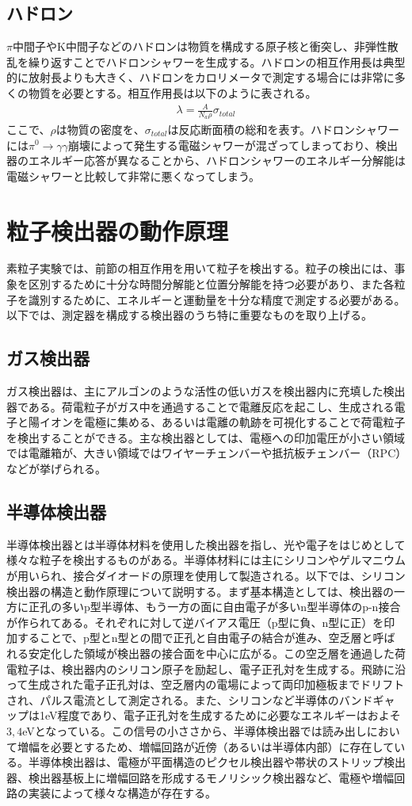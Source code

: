 \subsection{ハドロン}
$\pi$中間子やK中間子などのハドロンは物質を構成する原子核と衝突し、非弾性散乱を繰り返すことでハドロンシャワーを生成する。ハドロンの相互作用長は典型的に放射長よりも大きく、ハドロンをカロリメータで測定する場合には非常に多くの物質を必要とする。相互作用長は以下のように表される。
\begin{align}
\lambda = \frac{A}{N_a \rho} \sigma_{total}
\end{align}
ここで、$\rho$は物質の密度を、$ \sigma_{total}$は反応断面積の総和を表す。ハドロンシャワーには${\pi}^0 \rightarrow \gamma \gamma$崩壊によって発生する電磁シャワーが混ざってしまっており、検出器のエネルギー応答が異なることから、ハドロンシャワーのエネルギー分解能は電磁シャワーと比較して非常に悪くなってしまう。
\section{粒子検出器の動作原理}
 素粒子実験では、前節の相互作用を用いて粒子を検出する。粒子の検出には、事象を区別するために十分な時間分解能と位置分解能を持つ必要があり、また各粒子を識別するために、エネルギーと運動量を十分な精度で測定する必要がある。以下では、測定器を構成する検出器のうち特に重要なものを取り上げる。
\subsection{ガス検出器}
 ガス検出器は、主にアルゴンのような活性の低いガスを検出器内に充填した検出器である。荷電粒子がガス中を通過することで電離反応を起こし、生成される電子と陽イオンを電極に集める、あるいは電離の軌跡を可視化することで荷電粒子を検出することができる。主な検出器としては、電極への印加電圧が小さい領域では電離箱が、大きい領域ではワイヤーチェンバーや抵抗板チェンバー（RPC）などが挙げられる。
\subsection{半導体検出器}
 半導体検出器とは半導体材料を使用した検出器を指し、光や電子をはじめとして様々な粒子を検出するものがある。半導体材料には主にシリコンやゲルマニウムが用いられ、接合ダイオードの原理を使用して製造される。以下では、シリコン検出器の構造と動作原理について説明する。まず基本構造としては、検出器の一方に正孔の多いp型半導体、もう一方の面に自由電子が多いn型半導体のp-n接合が作られてある。それぞれに対して逆バイアス電圧（p型に負、n型に正）を印加することで、p型とn型との間で正孔と自由電子の結合が進み、空乏層と呼ばれる安定化した領域が検出器の接合面を中心に広がる。この空乏層を通過した荷電粒子は、検出器内のシリコン原子を励起し、電子正孔対を生成する。飛跡に沿って生成された電子正孔対は、空乏層内の電場によって両印加極板までドリフトされ、パルス電流として測定される。また、シリコンなど半導体のバンドギャップは1eV程度であり、電子正孔対を生成するために必要なエネルギーはおよそ$3,4$eVとなっている。この信号の小ささから、半導体検出器では読み出しにおいて増幅を必要とするため、増幅回路が近傍（あるいは半導体内部）に存在している。半導体検出器は、電極が平面構造のピクセル検出器や帯状のストリップ検出器、検出器基板上に増幅回路を形成するモノリシック検出器など、電極や増幅回路の実装によって様々な構造が存在する。
